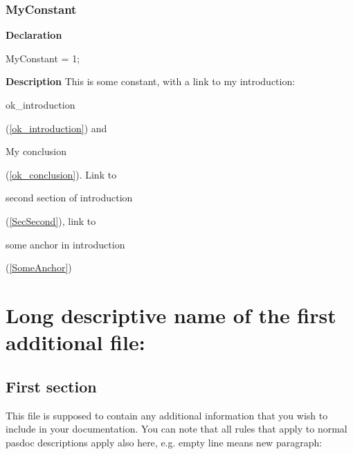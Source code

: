 \documentclass{report}
\newif\ifpdf
\begin{document}
\subsection*{MyConstant}
\fi
\label{ok_introduction_conclusion-MyConstant}
\begin{list}{}{
\setlength{\itemindent}{0cm}
\setlength{\listparindent}{0cm}
\setlength{\leftmargin}{\evensidemargin}
\addtolength{\leftmargin}{\tmplength}
\settowidth{\labelsep}{X}
\addtolength{\leftmargin}{\labelsep}
\setlength{\labelwidth}{\tmplength}
}
\item[\textbf{Declaration}\hfill]
\ifpdf
\begin{flushleft}
\fi
\begin{ttfamily}
MyConstant = 1;\end{ttfamily}

\ifpdf
\end{flushleft}
\fi

\par
\item[\textbf{Description}]
This is some constant, with a link to my introduction: \begin{ttfamily}ok{\_}introduction\end{ttfamily}(\ref{ok_introduction}) and \begin{ttfamily}My conclusion\end{ttfamily}(\ref{ok_conclusion}). Link to \begin{ttfamily}second section of introduction\end{ttfamily}(\ref{SecSecond}), link to \begin{ttfamily}some anchor in introduction\end{ttfamily}(\ref{SomeAnchor})

\end{list}
\chapter{Long descriptive name of the first additional file:}
\label{ok_additionalfile1}
 

 

\label{SecFirst}
\section{First section}


This file is supposed to contain any additional information that you wish to include in your documentation. You can note that all rules that apply to normal pasdoc descriptions apply also here, e.g. empty line means new paragraph:
\end{document}
